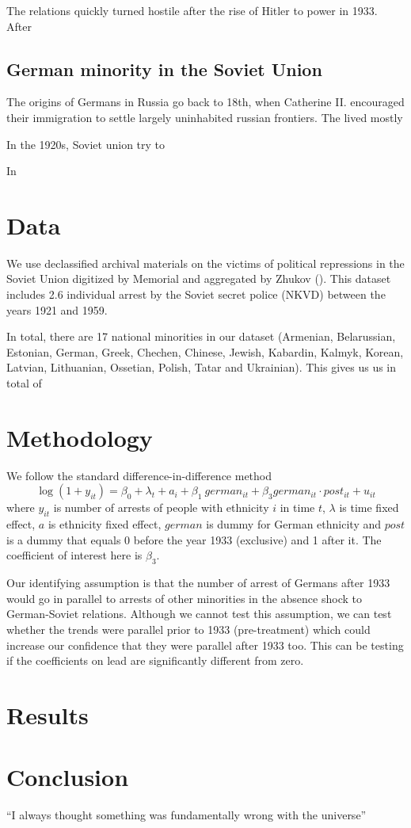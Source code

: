 \documentclass[12pt]{article}
\begin{document}
The relations quickly turned hostile after the rise of Hitler to power in 1933. After 

\subsection{German minority in the Soviet Union}
The origins of Germans in Russia go back to 18th, when Catherine II. encouraged their immigration to settle largely uninhabited russian frontiers. The lived mostly 

In the 1920s, Soviet union try to 

In 
\section{Data}
We use declassified archival materials on the victims of political repressions in the Soviet Union digitized by Memorial and aggregated by Zhukov (). This dataset includes 2.6 individual arrest by the Soviet secret police (NKVD) between  the years 1921 and 1959.

In total, there are 17 national minorities in our dataset (Armenian, Belarussian, Estonian, German, Greek, Chechen, Chinese, Jewish, Kabardin, Kalmyk, Korean, Latvian, Lithuanian, Ossetian, Polish, Tatar and Ukrainian). This gives us us in total of 
\section{Methodology}
We follow the standard difference-in-difference method
$$ \log\left(1 + y_{it}\right) = \beta_0 +\lambda_t + a_i + \beta_1 \: german_{it} + \beta_3 german_{it} \cdot post_{it} + u_{it} $$
where $y_{it}$ is number of arrests of people with ethnicity $i$ in time $t$, $\lambda$ is time fixed effect, $a$ is ethnicity fixed effect, $german$ is dummy for German ethnicity and $post$ is a dummy that equals 0 before the year 1933 (exclusive) and 1 after it. The coefficient of interest here is $\beta_3$. 

Our identifying assumption is that the number of arrest of Germans after 1933 would go in parallel to arrests of other minorities in the absence shock to German-Soviet relations. Although we cannot test this assumption, we can test whether the trends were parallel prior to 1933 (pre-treatment) which could increase our confidence that they were parallel after 1933 too. This can be testing if the coefficients on lead are significantly different from zero.  
\section{Results}

\section{Conclusion}
``I always thought something was fundamentally wrong with the universe'' \citep{adams1995hitchhiker}





\end{document}
